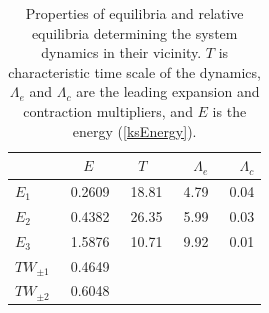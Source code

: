\documentclass[aip,cha,showpacs,reprint]{revtex4-1} %
\newcommand{\refeq}  [1] {(\ref{#1})}
\newcommand{\ExpaEig}{\ensuremath{\Lambda}}
\newcommand{\REQV}[2]{\ensuremath{TW_{#1#2}}} %
\newcommand{\EQV}[1]{\ensuremath{E_{#1}}}
\begin{document}
\begin{table}[ht]
    \caption{
    Properties of equilibria and relative equilibria determining
    the system dynamics in their vicinity.  $T$ is characteristic
    time scale of the dynamics, $\ExpaEig_e$ and $\ExpaEig_c$ are the
    leading expansion and contraction multipliers, and $E$ is the
    energy \refeq{ksEnergy}.
            }
\begin{center} \footnotesize
    \begin{tabular}{l|rrrr}
                 & $E$~~   & $T$~~  & $\ExpaEig_e$  & $\ExpaEig_c$  \\ \hline
 $\EQV{1}\ $     &\ 0.2609 &\ 18.81 &\ 4.79     &\ 0.04 \\
 $\EQV{2}\ $     &\ 0.4382 &\ 26.35 &\ 5.99     &\ 0.03 \\
 $\EQV{3}\ $     &\ 1.5876 &\ 10.71 &\ 9.92     &\ 0.01 \\
 $\REQV{\pm}{1}$ &\ 0.4649 &  &  & \\
 $\REQV{\pm}{2}$ &\ 0.6048 &  &  & \\
    \end{tabular}
\end{center}
\label{tab:L22cminus}
\end{table}
\end{document}
